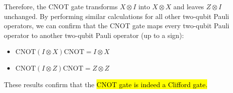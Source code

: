 \begin{examplebox}
    Therefore, the CNOT gate transforms $X \otimes I$ into $X \otimes X$ and leaves $Z \otimes I$ unchanged. By performing similar calculations for all other two-qubit Pauli operators, we can confirm that the CNOT gate maps every two-qubit Pauli operator to another two-qubit Pauli operator (up to a sign):
    \begin{itemize}
        \item $\text{CNOT}\left(I \otimes X\right)\text{CNOT} = I \otimes X$
        \item $\text{CNOT}\left(I \otimes Z\right)\text{CNOT} = Z \otimes Z$
    \end{itemize}
    These results confirm that the \hl{CNOT gate is indeed a Clifford gate.}
\end{examplebox}